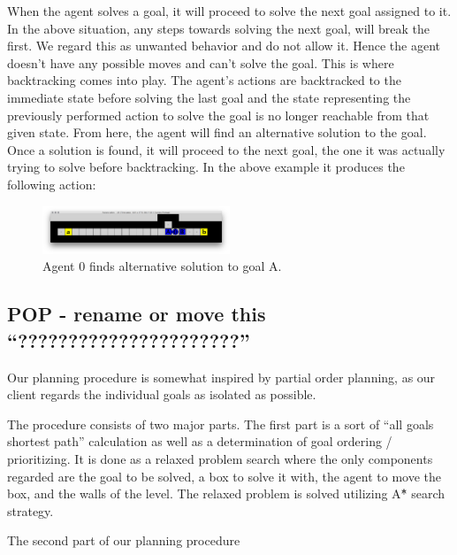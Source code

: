 \documentclass[Main]{subfiles}
\begin{document}
When the agent solves a goal, it will proceed to solve the next goal assigned to it. In the above situation, any steps towards solving the next goal, will break the first. We regard this as unwanted behavior and do not allow it. Hence the agent doesn't have any possible moves and can't solve the goal. This is where backtracking comes into play. The agent's actions are backtracked to the immediate state before solving the last goal and the state representing the previously performed action to solve the goal is no longer reachable from that given state. From here, the agent will find an alternative solution to the goal. Once a solution is found, it will proceed to the next goal, the one it was actually trying to solve before backtracking. In the above example it produces the following action:
\begin{figure}[h!]
    \centering
    \includegraphics[width=0.5\textwidth]{backtrack2.png}
    \caption{Agent 0 finds alternative solution to goal A.}
    \label{fig:backtrack2}
\end{figure}






\subsection{POP - rename or move this ``??????????????????????'' }

Our planning procedure is somewhat inspired by partial order planning, as our client regards the individual goals as isolated as possible. 

The procedure consists of two major parts. The first part is a sort of ``all goals shortest path'' calculation as well as a determination of goal ordering / prioritizing. 
It is done as a relaxed problem search where the only components regarded are the goal to be solved, a box to solve it with, the agent to move the box, and the walls of the level. The relaxed problem is solved utilizing A\^{*} search strategy. 

The second part of our planning procedure  




\end{document}
